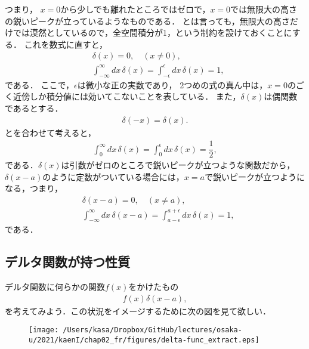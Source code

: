 \noindent
つまり，
$x=0$から少しでも離れたところではゼロで，$x=0$では無限大の高さの鋭いピークが立っているようなものである．
とは言っても，無限大の高さだけでは漠然としているので，全空間積分が1，という制約を設けておくことにする．
これを数式に直すと，
%
%
\begin{align}
 & \delta \left(x\right) = 0, \quad (x\neq 0), \label{delta_func_def_01}\\
 &  \int_{-\infty}^{\infty} dx\,\delta\left(x\right) = \int_{-\epsilon}^{\epsilon} dx\,\delta\left(x\right) = 1,\label{delta_func_def_02}
\end{align}
である．
%
ここで，$\epsilon$は微小な正の実数であり，
2つめの式の真ん中は，$x=0$のごく近傍しか積分値には効いてこないことを表している．
また，$\delta(x)$は偶関数であるとする．
\begin{align}
 \delta (-x) = \delta (x). \label{delta_func_def_03}
\end{align}
とを合わせて考えると，
\begin{align}
 \int_{0}^{\infty}dx\,\delta(x) = \int_{0}^{\epsilon}dx\,\delta(x) = \dfrac{1}{2}, 
\end{align}
である．$\delta (x)$は引数がゼロのところで鋭いピークが立つような関数だから，
$\delta (x-a)$のように定数がついている場合には，$x=a$で鋭いピークが立つようになる，つまり，
\begin{align}
 & \delta \left(x-a\right) = 0, \quad (x\neq a),\\
 &  \int_{-\infty}^{\infty} dx\,\delta\left(x-a\right) = \int_{a-\epsilon}^{a+\epsilon} dx\,\delta\left(x\right) = 1, \label{delta_func_shift}
\end{align}
である．
%
\subsection{デルタ関数が持つ性質}
%
デルタ関数に何らかの関数$f(x)$をかけたもの
\begin{align}
  f\left(x\right)\delta\left(x-a\right),
\end{align}
を考えてみよう．この状況をイメージするために次の図を見て欲しい．

\begin{figure}[htbp]
  \centering
  \texttt{[image: /Users/kasa/Dropbox/GitHub/lectures/osaka-u/2021/kaenI/chap02\_fr/figures/delta-func\_extract.eps]} 
\end{figure}

